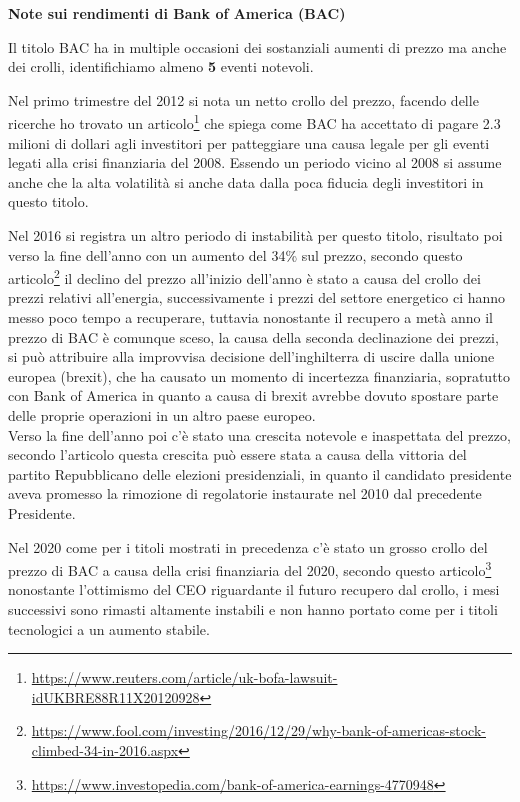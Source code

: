 \textbf{Note sui rendimenti di Bank of America (BAC)}

Il titolo BAC ha in multiple occasioni dei sostanziali aumenti di prezzo ma anche dei crolli, identifichiamo almeno \textbf{5} eventi notevoli.

Nel primo trimestre del 2012 si nota un netto crollo del prezzo, facendo delle ricerche ho trovato un 
articolo\footnote{
  \href{https://www.reuters.com/article/uk-bofa-lawsuit-idUKBRE88R11X20120928}{https://www.reuters.com/article/uk-bofa-lawsuit-idUKBRE88R11X20120928}
}
che spiega come BAC ha accettato di pagare 2.3 milioni di dollari agli investitori per patteggiare una causa legale per gli eventi legati alla crisi finanziaria del 2008.
Essendo un periodo vicino al 2008 si assume anche che la alta volatilità si anche data dalla poca fiducia degli investitori in questo titolo.

Nel 2016 si registra un altro periodo di instabilità per questo titolo, risultato poi verso la fine dell'anno con un aumento del 34\% sul prezzo,
secondo questo 
articolo\footnote{
  \href{https://www.fool.com/investing/2016/12/29/why-bank-of-americas-stock-climbed-34-in-2016.aspx}{https://www.fool.com/investing/2016/12/29/why-bank-of-americas-stock-climbed-34-in-2016.aspx}
}
il declino del prezzo all'inizio dell'anno è stato a causa del crollo dei prezzi relativi all'energia,
successivamente i prezzi del settore energetico ci hanno messo poco tempo a recuperare, tuttavia nonostante il recupero a metà anno il prezzo di BAC è comunque sceso,
la causa della seconda declinazione dei prezzi, si può attribuire alla improvvisa decisione dell'inghilterra di uscire dalla unione europea (brexit), che ha causato un momento
di incertezza finanziaria, sopratutto con Bank of America in quanto a causa di brexit avrebbe dovuto spostare parte delle proprie operazioni in un altro paese europeo.\\
Verso la fine dell'anno poi c'è stato una crescita notevole e inaspettata del prezzo, secondo l'articolo questa crescita può essere stata a causa della vittoria del partito
Repubblicano delle elezioni presidenziali, in quanto il candidato presidente aveva promesso la rimozione di regolatorie instaurate nel 2010 dal precedente Presidente.

Nel 2020 come per i titoli mostrati in precedenza c'è stato un grosso crollo del prezzo di BAC a causa della crisi finanziaria del 2020, secondo questo 
articolo\footnote{
  \href{https://www.investopedia.com/bank-of-america-earnings-4770948}{https://www.investopedia.com/bank-of-america-earnings-4770948}
}
nonostante l'ottimismo del CEO riguardante il futuro recupero dal crollo, i mesi successivi sono rimasti altamente instabili e non hanno portato come per i titoli tecnologici
a un aumento stabile.\\

